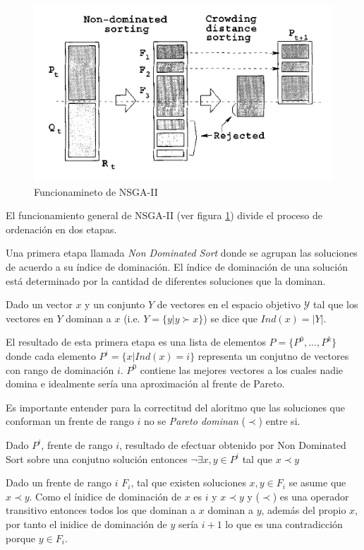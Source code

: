 \begin{figure}[ht]\caption{Funcionamineto de NSGA-II}\label{proposal:fig:nsga2}
    \centering
    \includegraphics[scale=0.5]{Pictures/nsga2.png}
\end{figure}

El funcionamiento general de NSGA-II (ver figura \ref{proposal:fig:nsga2}) divide el proceso de ordenaci\'on en dos etapas.

Una primera etapa llamada \textit{Non Dominated Sort} donde se agrupan las soluciones de acuerdo a su \'indice de dominaci\'on. El \'indice de dominaci\'on de una soluci\'on est\'a determinado por la cantidad de diferentes soluciones que la dominan.
\begin{definition}
    \label{proposal:def:domination_index}
    Dado un vector $x$ y un conjunto $Y$ de vectores en el espacio objetivo $\mathcal{Y}$ tal que los vectores en $Y$ dominan a $x$ (i.e. $Y = \{y | y \succ x\}$) se dice que $Ind(x) = |Y|$.
\end{definition}
El resultado de esta primera etapa es una lista de elementos $P = \{P^0, ..., P^k\}$ donde cada elemento $P^i = \{x | Ind(x) = i\}$ representa un conjutno de vectores con rango de dominaci\'on $i$. $P^0$ contiene las mejores vectores a los cuales nadie domina e idealmente ser\'ia una aproximaci\'on al frente de Pareto.

Es importante entender para la correctitud del aloritmo  que las soluciones que conforman un frente de rango $i$ no se \textit{Pareto dominan} ($\prec$) entre si.
\begin{theorem}
Dado $P^i$, frente de rango $i$, resultado de efectuar obtenido por Non Dominated Sort sobre una conjutno soluci\'on entonces $\neg \exists x, y \in P^i$ tal que $x \prec y$
\end{theorem}
Dado un frente de rango $i$ $F_i$, tal que existen soluciones $x, y \in F_i$ se asume que $x \prec y$. Como el \'inidice de dominaci\'on de $x$ es $i$ y $x \prec y$ y ($\prec$) es una operador transitivo entonces todos los que dominan a $x$ dominan a $y$, adem\'as del propio $x$, por tanto el inidice de dominaci\'on de $y$ ser\'ia $i+1$ lo que es una contradicci\'on porque $y \in F_i$. 

